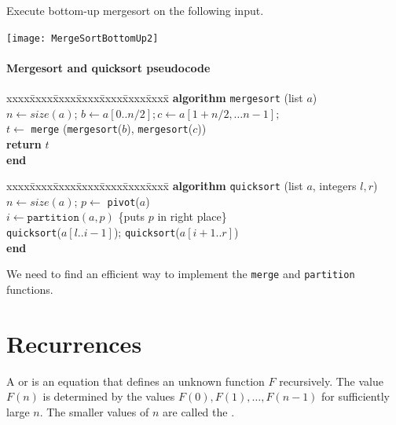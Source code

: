 \begin{Boxample}[0]
Execute  bottom-up mergesort  on the following input.
\begin{center}
\texttt{[image: MergeSortBottomUp2]}
\end{center}
\end{Boxample}


\begin{frame}
\frametitle{Mergesort and quicksort pseudocode}
\begin{tabbing}
xxxx\=xxxx\=xxxx\=xxxx\=xxxx\=xxxx\=xxxx\= \kill
\textbf{algorithm} \texttt{mergesort} (list $a$) \\
$n \gets size(a)$; $b \gets a[0..n/2]; c \gets a[1+n/2, \dots n-1];$ \\
$t \gets $ \texttt{merge} (\texttt{mergesort}($b$), \texttt{mergesort}($c$)) \\
\textbf{return} $t$ \\
\textbf{end}
\end{tabbing}	
\begin{tabbing}
xxxx\=xxxx\=xxxx\=xxxx\=xxxx\=xxxx\=xxxx\= \kill
\textbf{algorithm} \texttt{quicksort} (list $a$, integers $l, r$) \\
$n \gets size(a)$; $p \gets$ \texttt{pivot}($a$)\\
$i \gets \texttt{partition}(a, p)$ \quad \{puts $p$ in right place\} \\
\texttt{quicksort}($a[l..i-1]$); \texttt{quicksort}($a[i+1..r]$)\\
\textbf{end}
\end{tabbing}

We need to find an efficient way to implement the \texttt{merge} and 
\texttt{partition} functions.
\end{frame}
\fi

\chapter{Recurrences} %
\begin{Definition}
A  or  is an
equation that defines an unknown function $F$ recursively. 
The value $F(n)$ is determined by the values $F(0), F(1), \dots, F(n-1)$ for
sufficiently large $n$. The smaller values of $n$ are called the
. 
\end{Definition}

